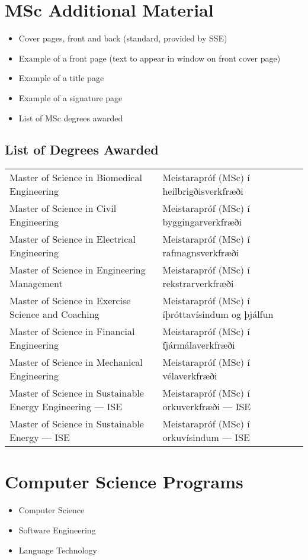 \section{MSc Additional Material}
\begin{itemize}
\item Cover pages, front and back (standard, provided by SSE)
\item Example of a front page (text to appear in window on front cover page)
\item Example of a title page
\item Example of a signature page
\item List of MSc degrees awarded
\end{itemize}

\subsection{List of Degrees Awarded}

\begin{tabular}{ll}
  Master of Science in Biomedical Engineering &Meistarapróf (MSc) í heilbrigðisverkfræði\\
  Master of Science in Civil Engineering &Meistarapróf (MSc) í byggingarverkfræði\\
  Master of Science in Electrical Engineering &Meistarapróf (MSc) í rafmagnsverkfræði\\
  Master of Science in Engineering Management &Meistarapróf (MSc) í rekstrarverkfræði\\
  Master of Science in Exercise Science and Coaching &Meistarapróf (MSc) í íþróttavísindum og þjálfun\\
  Master of Science in Financial Engineering &Meistarapróf (MSc) í fjármálaverkfræði\\
  Master of Science in Mechanical Engineering &Meistarapróf (MSc) í vélaverkfræði\\
  Master of Science in Sustainable Energy Engineering --- ISE &Meistarapróf (MSc) í orkuverkfræði --- ISE\\
  Master of Science in Sustainable Energy --- ISE &Meistarapróf (MSc) í orkuvísindum --- ISE\\
  \end{tabular}

\section{Computer Science Programs}
\begin{itemize}
\item Computer Science
\item Software Engineering
\item Language Technology               
\end{itemize}


